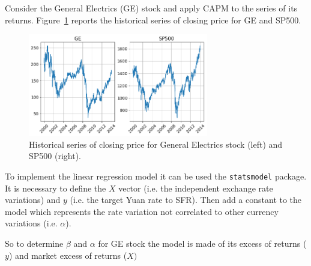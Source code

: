 Consider the General Electrics (GE) stock and apply CAPM to the series of its returns. Figure~\ref{fig:ge_returns} reports the historical series of closing price for GE and SP500.

\begin{figure}[htbp]
\centering
\includegraphics[width=0.7\textwidth]{figures/capm_ge}
\caption{Historical series of closing price for General Electrics stock (left) and SP500 (right).}
\label{fig:ge_returns}
\end{figure}

To implement the linear regression model it can be used the \texttt{statsmodel} package. It is necessary to define the $X$ vector (i.e. the independent exchange rate variations) and $y$ (i.e. the target Yuan rate to SFR). Then add a constant to the model which represents the rate variation not correlated to other currency variations (i.e. $\alpha$).

So to determine $\beta$ and $\alpha$ for GE stock the model is made of its excess of returns ($y$) and market excess of returns ($X)$ 

